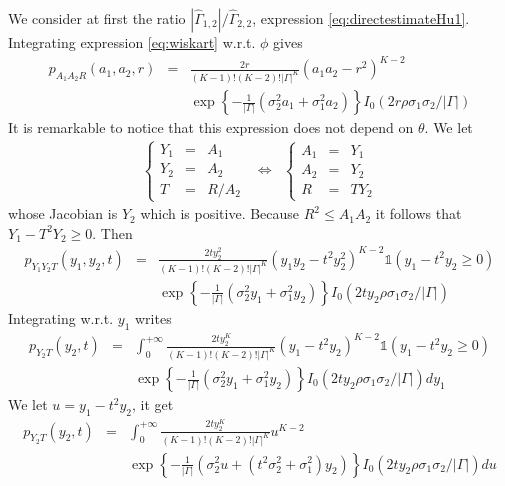 We consider at first the ratio $|\hat \Gamma_{1,2}|/\hat \Gamma_{2,2}$, expression \eqref{eq:directestimateHu1}. Integrating expression \eqref{eq:wiskart} w.r.t. $\phi$ gives
\begin{eqnarray*}
p_{A_{1}A_{2}R}
 (a_{1},a_{2},r)
 &=&
 \frac{2r}{(K-1)!(K-2)!|\Gamma|^{K}}
 (a_{1}a_{2}-r^{2})^{K-2}
  \\
 &&
 \exp\left\{
 -\frac{1}{|\Gamma|}
 \left(\sigma_{2}^{2}a_{1}+\sigma_{1}^{2}a_{2}\right)
 \right\}
 I_{0}(2r\rho\sigma_{1}\sigma_{2}/|\Gamma|)
\end{eqnarray*}
It is remarkable to notice that this expression does not depend on $\theta$. We let
\begin{eqnarray}
\left\{
 \begin{array}{rcl}
 Y_{1}&=&A_{1}
 \\
 Y_{2}&=&A_{2}
 \\
 T&=&R/A_{2}
 \end{array}
\right.
&\Leftrightarrow&
\left\{
 \begin{array}{rcl}
 A_{1}&=&Y_{1}
 \\
 A_{2}&=&Y_{2}
 \\
 R&=&TY_{2}
 \end{array}
 \right.
\end{eqnarray}
whose Jacobian is $Y_{2}$ which is positive. Because $R^{2}\leq A_{1}A_{2}$ it follows that $Y_{1}-T^{2}Y_{2}\geq 0$. Then
\begin{eqnarray*}
p_{Y_{1}Y_{2}T}
 (y_{1},y_{2},t)
 &=&
 \frac{2t y_{2}^{2}}{(K-1)!(K-2)!|\Gamma|^{K}}
 (y_{1}y_{2}-t^{2}y_{2}^{2})^{K-2}\mathds{1}(y_{1}-t^{2}y_{2}\geq 0)
  \\
 && 
 \exp\left\{
 -\frac{1}{|\Gamma|}
 \left(\sigma_{2}^{2}y_{1}+\sigma_{1}^{2}y_{2}\right)
 \right\}
 I_{0}(2ty_{2}\rho\sigma_{1}\sigma_{2}/|\Gamma|)
\end{eqnarray*}
Integrating w.r.t. $y_{1}$ writes
\begin{eqnarray*}
p_{Y_{2}T}
 (y_{2},t)
 &=&\int_{0}^{+\infty}
 \frac{2t y_{2}^{K}}{(K-1)!(K-2)!|\Gamma|^{K}}
 (y_{1}-t^{2}y_{2})^{K-2}\mathds{1}(y_{1}-t^{2}y_{2}\geq 0)
  \\
 && 
  \exp\left\{
 -\frac{1}{|\Gamma|}
 \left(\sigma_{2}^{2}y_{1}+\sigma_{1}^{2}y_{2}\right)
 \right\}
 I_{0}(2ty_{2}\rho\sigma_{1}\sigma_{2}/|\Gamma|)dy_{1}
\end{eqnarray*}
We let $u=y_{1}-t^{2}y_{2}$, it get
\begin{eqnarray*}
p_{Y_{2}T}
 (y_{2},t)
 &=&\int_{0}^{+\infty}
 \frac{2t y_{2}^{K}}{(K-1)!(K-2)!|\Gamma|^{K}}
 u^{K-2}
   \\
 && 
  \exp\left\{
 -\frac{1}{|\Gamma|}
 \left(\sigma_{2}^{2}u+(t^{2}\sigma_{2}^{2}+\sigma_{1}^{2})y_{2}\right)
 \right\}
 I_{0}(2ty_{2}\rho\sigma_{1}\sigma_{2}/|\Gamma|)du
\end{eqnarray*}
